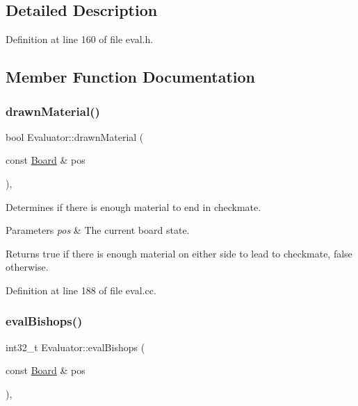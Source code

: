 \subsection{Detailed Description}


Definition at line 160 of file eval.\+h.



\subsection{Member Function Documentation}
\mbox{\label{classEvaluator_aec21b1e28f162b7f1e4edc9e8f725a8b}} 
\subsubsection{\texorpdfstring{drawn\+Material()}{drawnMaterial()}}
{\footnotesize\ttfamily bool Evaluator\+::drawn\+Material (\begin{DoxyParamCaption}\item[{const \mbox{\hyperlink{classBoard}{Board}} \&}]{pos }\end{DoxyParamCaption})\hspace{0.3cm}{\ttfamily [private]}, {\ttfamily [noexcept]}}



Determines if there is enough material to end in checkmate. 


\begin{DoxyParams}{Parameters}
{\em pos} & The current board state. \\
\hline
\end{DoxyParams}
\begin{DoxyReturn}{Returns}
true if there is enough material on either side to lead to checkmate, false otherwise. 
\end{DoxyReturn}


Definition at line 188 of file eval.\+cc.

\mbox{\label{classEvaluator_ab8235a37e631665e0dbdbffdddf015f7}} 
\subsubsection{\texorpdfstring{eval\+Bishops()}{evalBishops()}}
{\footnotesize\ttfamily int32\+\_\+t Evaluator\+::eval\+Bishops (\begin{DoxyParamCaption}\item[{const \mbox{\hyperlink{classBoard}{Board}} \&}]{pos }\end{DoxyParamCaption})\hspace{0.3cm}{\ttfamily [private]}, {\ttfamily [noexcept]}}



